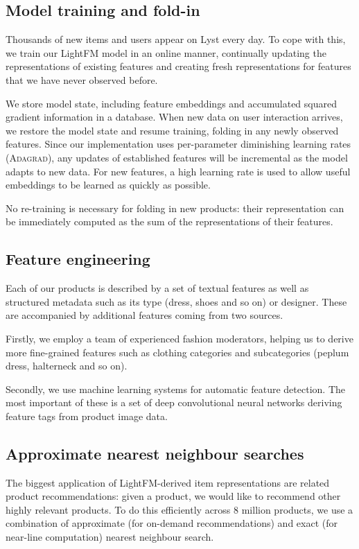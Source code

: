 \documentclass{sig-alternate}
\providecommand\authInstitution{Lyst}
\begin{document}
\subsection{Model training and fold-in}
Thousands of new items and users appear on \authInstitution{} every day. To cope with this, we train our LightFM model in an online manner, continually updating the representations of existing features and creating fresh representations for features that we have never observed before.

We store model state, including feature embeddings and accumulated squared gradient information in a database. When new data on user interaction arrives, we restore the model state and resume training, folding in any newly observed features. Since our implementation uses per-parameter diminishing learning rates (\textsc{Adagrad}), any updates of established features will be incremental as the model adapts to new data. For new features, a high learning rate is used to allow useful embeddings to be learned as quickly as possible.

No re-training is necessary for folding in new products: their representation can be immediately computed as the sum of the representations of their features.

\vspace{10 mm}

\subsection{Feature engineering}
Each of our products is described by a set of textual features as well as structured metadata such as its type (dress, shoes and so on) or designer. These are accompanied by additional features coming from two sources.

Firstly, we employ a team of experienced fashion moderators, helping us to derive more fine-grained features such as clothing categories and subcategories (peplum dress, halterneck and so on).

Secondly, we use machine learning systems for automatic feature detection. The most important of these is a set of deep convolutional neural networks deriving feature tags from product image data.

\subsection{Approximate nearest neighbour searches}
The biggest application of LightFM-derived item representations are related product recommendations: given a product, we would like to recommend other highly relevant products. To do this efficiently across 8 million products, we use a combination of approximate (for on-demand recommendations) and exact (for near-line computation) nearest neighbour search.
\end{document}
